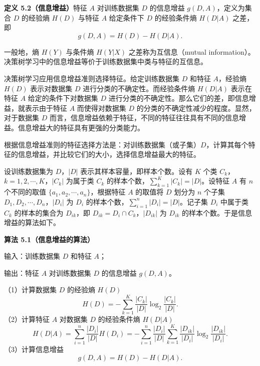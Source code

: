 \documentclass[UTF8, 12pt, fontset=fandol, oneside]{ctexart}
\begin{document}
\noindent\textbf{定义 5.2（信息增益）}\quad 特征 $A$ 对训练数据集 $D$ 的信息增益 $g(D,A)$，定义为集合 $D$ 的经验熵 $H(D)$ 与特征 $A$ 给定条件下 $D$ 的经验条件熵 $H(D|A)$ 之差，即
\begin{equation}
  g(D,A)=H(D)-H(D|A).
  \tag{5.6}
\end{equation}

一般地，熵 $H(Y)$ 与条件熵 $H(Y|X)$ 之差称为互信息（mutual information）。决策树学习中的信息增益等价于训练数据集中类与特征的互信息。

决策树学习应用信息增益准则选择特征。给定训练数据集 $D$ 和特征 $A$，经验熵 $H(D)$ 表示对数据集 $D$ 进行分类的不确定性。而经验条件熵 $H(D|A)$ 表示在特征 $A$ 给定的条件下对数据集 $D$ 进行分类的不确定性。那么它们的差，即信息增益，就表示由于特征 $A$ 而使得对数据集 $D$ 的分类的不确定性减少的程度。显然，对于数据集 $D$ 而言，信息增益依赖于特征，不同的特征往往具有不同的信息增益。信息增益大的特征具有更强的分类能力。

根据信息增益准则的特征选择方法是：对训练数据集（或子集）$D$，计算其每个特征的信息增益，并比较它们的大小，选择信息增益最大的特征。

设训练数据集为 $D$，$|D|$ 表示其样本容量，即样本个数。设有 $K$ 个类 $C_k$，$k=1,2,\cdots,K$，$|C_k|$ 为属于类 $C_k$ 的样本个数，$\sum_{k=1}^{K}|C_k|=|D|$。设特征 $A$ 有 $n$ 个不同的取值 $\{a_1,a_2,\cdots,a_n\}$，根据特征 $A$ 的取值将 $D$ 划分为 $n$ 个子集 $D_1,D_2,\cdots,D_n$，$|D_i|$ 为 $D_i$ 的样本个数，$\sum_{i=1}^{n}|D_i|=|D|$。记子集 $D_i$ 中属于类 $C_k$ 的样本的集合为 $D_{ik}$，即 $D_{ik}=D_i\cap C_k$，$|D_{ik}|$ 为 $D_{ik}$ 的样本个数。于是信息增益的算法如下。

\noindent\textbf{算法 5.1（信息增益的算法）}

输入：训练数据集 $D$ 和特征 $A$；

输出：特征 $A$ 对训练数据集 $D$ 的信息增益 $g(D,A)$。

（1）计算数据集 $D$ 的经验熵 $H(D)$
\begin{equation}
  H(D)=-\sum_{k=1}^{K}\frac{|C_k|}{|D|}\log_2\frac{|C_k|}{|D|}.
  \tag{5.7}
\end{equation}
（2）计算特征 $A$ 对数据集 $D$ 的经验条件熵 $H(D|A)$
\begin{equation}
  H(D|A)=\sum_{i=1}^{n}\frac{|D_i|}{|D|}H(D_i)
  =-\sum_{i=1}^{n}\frac{|D_i|}{|D|}\sum_{k=1}^{K}\frac{|D_{ik}|}{|D_i|}\log_2\frac{|D_{ik}|}{|D_i|}.
  \tag{5.8}
\end{equation}
（3）计算信息增益
\begin{equation}
  g(D,A)=H(D)-H(D|A).
  \tag{5.9}
\end{equation}
\end{document}
